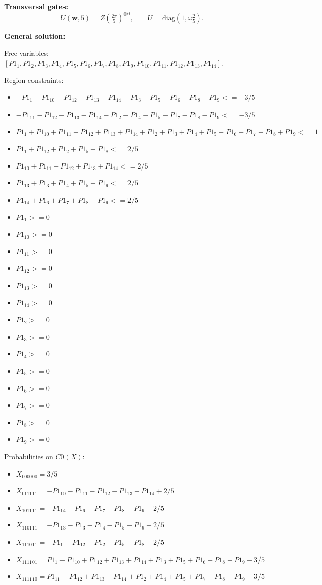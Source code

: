 \documentclass[11pt]{article}
\begin{document}
\noindent\textbf{Transversal gates:}
\[
    U(\mathbf w,5)=Z \left(\tfrac{2\pi}{5}\right)^{\otimes6} ,\qquad
    \overline U=\mathrm{diag}(1,\omega_{5}^{2}).
\]

\noindent\textbf{General solution:}

Free variables: $[P1_1, P1_2, P1_3, P1_4, P1_5, P1_6, P1_7, P1_8, P1_9, P1_{10}, P1_{11}, P1_{12}, P1_{13}, P1_{14}]$.

Region constraints:
\begin{itemize}
    \item $-P1_1 - P1_{10} - P1_{12} - P1_{13} - P1_{14} - P1_3 - P1_5 - P1_6 - P1_8 - P1_9 <= -3/5$
    \item $-P1_{11} - P1_{12} - P1_{13} - P1_{14} - P1_2 - P1_4 - P1_5 - P1_7 - P1_8 - P1_9 <= -3/5$
    \item $P1_1 + P1_{10} + P1_{11} + P1_{12} + P1_{13} + P1_{14} + P1_2 + P1_3 + P1_4 + P1_5 + P1_6 + P1_7 + P1_8 + P1_9 <= 1$
    \item $P1_1 + P1_{12} + P1_2 + P1_5 + P1_8 <= 2/5$
    \item $P1_{10} + P1_{11} + P1_{12} + P1_{13} + P1_{14} <= 2/5$
    \item $P1_{13} + P1_3 + P1_4 + P1_5 + P1_9 <= 2/5$
    \item $P1_{14} + P1_6 + P1_7 + P1_8 + P1_9 <= 2/5$
    \item $P1_1 >= 0$
    \item $P1_{10} >= 0$
    \item $P1_{11} >= 0$
    \item $P1_{12} >= 0$
    \item $P1_{13} >= 0$
    \item $P1_{14} >= 0$
    \item $P1_2 >= 0$
    \item $P1_3 >= 0$
    \item $P1_4 >= 0$
    \item $P1_5 >= 0$
    \item $P1_6 >= 0$
    \item $P1_7 >= 0$
    \item $P1_8 >= 0$
    \item $P1_9 >= 0$
\end{itemize}

Probabilities on $C0 (X)$:
\begin{itemize}
    \item $X_{000000} = 3/5$
    \item $X_{011111} = -P1_{10} - P1_{11} - P1_{12} - P1_{13} - P1_{14} + 2/5$
    \item $X_{101111} = -P1_{14} - P1_6 - P1_7 - P1_8 - P1_9 + 2/5$
    \item $X_{110111} = -P1_{13} - P1_3 - P1_4 - P1_5 - P1_9 + 2/5$
    \item $X_{111011} = -P1_1 - P1_{12} - P1_2 - P1_5 - P1_8 + 2/5$
    \item $X_{111101} = P1_1 + P1_{10} + P1_{12} + P1_{13} + P1_{14} + P1_3 + P1_5 + P1_6 + P1_8 + P1_9 - 3/5$
    \item $X_{111110} = P1_{11} + P1_{12} + P1_{13} + P1_{14} + P1_2 + P1_4 + P1_5 + P1_7 + P1_8 + P1_9 - 3/5$
\end{itemize}
\end{document}
